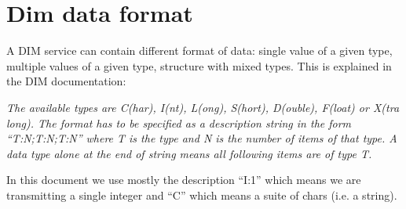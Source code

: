 \documentclass[a4paper]{article}
\begin{document}
\appendix
\appendixpage
\section{Dim data format}\label{app:dimFormat}
%
A DIM service can contain different format of data: single value of a given
type, multiple values of a given type, structure with mixed types. This is
explained in the DIM documentation\cite{biblio:DIM}:

\textit{The available types are C(har), I(nt), L(ong), S(hort), D(ouble),
F(loat) or X(tra long). The format has to be specified as a description string in the form
``T:N;T:N;T:N'' where T is the type and N is the number of items of that type.
A data type alone at the end of string means all following items are of type T.}

In this document we use mostly the description ``I:1'' which means we are
transmitting a single integer and ``C'' which means a suite of chars (i.e. a
string).

\thebibliography{}

\end{document}
